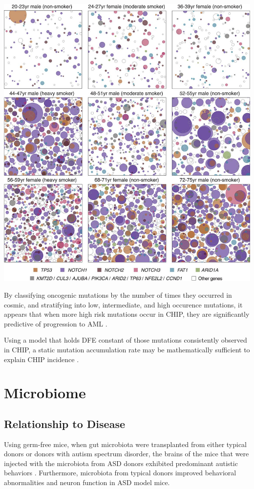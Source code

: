 \documentclass[]{book}
\begin{document}
\includegraphics{images/04-5.jpg}

By classifying oncogenic mutations by the number of times they occurred
in cosmic, and stratifying into low, intermediate, and high occurence
mutations, it appears that when more high risk mutations occur in CHIP,
they are significantly predictive of progression to AML
\citep{abelson2018prediction}.

Using a model that holds DFE constant of those mutations consistently
observed in CHIP, a static mutation accumulation rate may be
mathematically sufficient to explain CHIP incidence
\citep{Watson2019-lg}.

\chapter{Microbiome}\label{microbiome}

\section{Relationship to Disease}\label{relationship-to-disease}

Using germ-free mice, when gut microbiota were transplanted from either
typical donors or donors with autism spectrum disorder, the brains of
the mice that were injected with the microbiota from ASD donors
exhibited predominant autistic behaviors \citep{sharon2019human}.
Furthermore, microbiota from typical donors improved behavioral
abnormalities and neuron function in ASD model mice.
\end{document}
